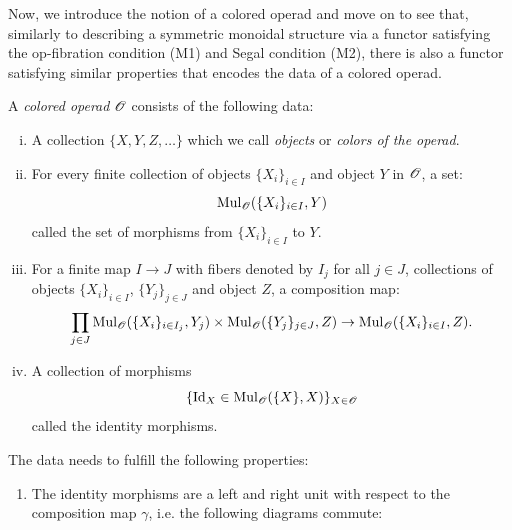 Now, we introduce the notion of a colored operad and move on to see
that, similarly to describing a symmetric monoidal structure via a functor
satisfying the op-fibration condition (M1) and Segal condition (M2), there is
also a functor satisfying similar properties that encodes the data of a colored
operad.

\begin{defin}\label{coloroperad} A {\em colored operad} $\mathscr{O}$ consists of the
    following data:
    \begin{enumerate}[(i)]
        \item A collection $\{X,Y,Z, \dots\}$ which we call \emph{objects} or
        \emph{colors of the operad}.
        \item For every finite collection of objects $\{X_i\}_{i \in I}$ and
        object $Y$ in $\mathscr{O}$, a set:
        $$\operatorname{Mul}_{\mathscr{O}}(\{X_i\}_{i \in I}, Y)$$ called the set of morphisms from
        $\{X_i\}_{i \in I}$ to $Y$.
        \item For a finite map $I \to J$ with fibers denoted by $I_j$ for all $j
        \in J$, collections of objects $\{X_i\}_{i \in I}$, $\{Y_j\}_{j \in J}$
        and object $Z$, a composition map:
        \[
            \prod_{j \in J} \operatorname{Mul}_{\mathscr{O}}(\{X_i\}_{i \in I_j}, Y_j) \times \operatorname{Mul}_{\mathscr{O}}(\{Y_j\}_{j\in J}, Z) \to \operatorname{Mul}_{\mathscr{O}}(\{X_i\}_{i \in I}, Z).  
        \]
        \item A collection of morphisms 
        $$\{ \operatorname{Id}_X \in \operatorname{Mul}_{\mathscr{O}}(\{X\},X)\}_{X \in \mathscr{O}}$$ called the identity
        morphisms.
        \end{enumerate}

        The data needs to fulfill the following properties:
        \begin{enumerate}
            \item The identity morphisms are a left and right unit with respect
            to the composition map $\gamma$, i.e. the following diagrams
            commute:
            \begin{center}
            \end{center}
       

\end{enumerate}
\end{defin}
